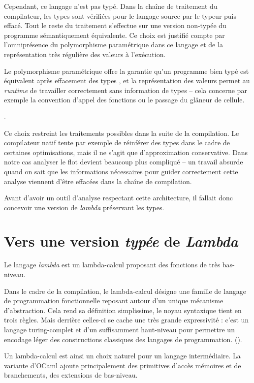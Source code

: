 Cependant, ce langage n'est pas typé. Dans la chaîne de traitement du
compilateur, les types sont vérifiées pour le langage source par le typeur puis
effacé. Tout le reste du traitement s'effectue sur une version non-typée du
programme sémantiquement équivalente. Ce choix est justifié compte par
l'omniprésence du polymorphisme paramétrique dans ce langage et de la
représentation très régulière des valeurs à l'exécution.

Le polymorphisme paramétrique offre la garantie qu'un programme bien typé est
équivalent après effacement des types , et la
représentation des valeurs permet au \emph{runtime} de travailler correctement
sans information de types -- cela concerne par exemple la convention d'appel
des fonctions ou le passage du glâneur de cellule.

.

Ce choix restreint les traitements possibles dans la suite de la compilation.
Le compilateur natif tente par exemple de réinférer des types dans le cadre de
certaines optimisations, mais il ne s'agit que d'approximation conservative.
Dans notre cas analyser le flot devient beaucoup plus compliqué -- un travail
absurde quand on sait que les informations nécessaires pour guider correctement
cette analyse viennent d'être effacées dans la chaîne de compilation.

Avant d'avoir un outil d'analyse respectant cette architecture, il fallait donc
concevoir une version de \emph{lambda} préservant les types.

\section{Vers une version \emph{typée} de \emph{Lambda}}

Le langage \emph{lambda} est un lambda-calcul proposant des fonctions de très
bas-niveau.

Dans le cadre de la compilation, le lambda-calcul désigne une famille de
langage de programmation fonctionnelle reposant autour d'un unique mécanisme
d'abstraction.  Cela rend sa définition simplissime, le noyau syntaxique tient
en trois règles.  Mais derrière celles-ci se cache une très grande expressivité
: c'est un langage turing-complet et d'un suffisamment haut-niveau pour
permettre un encodage léger des constructions classiques des langages de
programmation.  ().

Un lambda-calcul est ainsi un choix naturel pour un langage intermédiaire. La
variante d'OCaml ajoute principalement des primitives d'accès mémoires et de
branchements, des extensions de bas-niveau.

